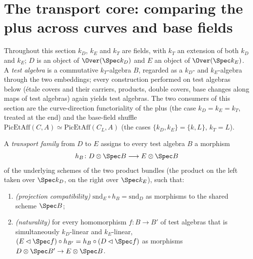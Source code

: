 \section{The transport core: comparing the plus across curves and base fields}

Throughout this section \(k_D\), \(k_E\) and \(k_T\) are fields, with \(k_T\) an extension
of both \(k_D\) and \(k_E\); \(D\) is an object of \(\Over(\Spec k_D)\) and \(E\) an object
of \(\Over(\Spec k_E)\). A \emph{test algebra} is a commutative \(k_T\)-algebra \(B\),
regarded as a \(k_D\)- and \(k_E\)-algebra through the two embeddings; every construction
performed on test algebras below (\'etale covers and their carriers, products, double
covers, base changes along maps of test algebras) again yields test algebras. The two
consumers of this section are the curve-direction functoriality of the plus (the case
\(k_D = k_E = k_T\), treated at the end) and the base-field shuffle
\(\mathrm{PicEtAff}(C, A) \simeq \mathrm{PicEtAff}(C_L, A)\) (the cases
\(\{k_D, k_E\} = \{k, L\}\), \(k_T = L\)).

\begin{definition}
  \label{def:relPicTransportFamily}
  \leanok
  A \emph{transport family} from \(D\) to \(E\) assigns to every test algebra \(B\) a
  morphism
  \[
    h_B \colon D \otimes \Spec B \longrightarrow E \otimes \Spec B
  \]
  of the underlying schemes of the two product bundles (the product on the left taken over
  \(\Spec k_D\), on the right over \(\Spec k_E\)), such that:
  \begin{enumerate}
  \item \emph{(projection compatibility)} \(\mathrm{snd}_E \circ h_B = \mathrm{snd}_D\) as
    morphisms to the shared scheme \(\Spec B\);
  \item \emph{(naturality)} for every homomorphism \(f \colon B \to B'\) of test algebras
    that is simultaneously \(k_D\)-linear and \(k_E\)-linear,
    \((E \lhd \Spec f) \circ h_{B'} = h_B \circ (D \lhd \Spec f)\) as morphisms
    \(D \otimes \Spec B' \to E \otimes \Spec B\).
  \end{enumerate}
\end{definition}

